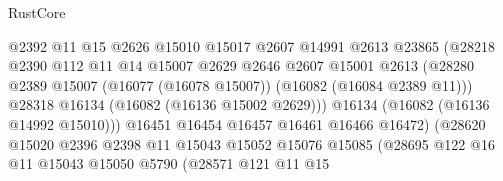 \begin{lexlean}{RustCore}
\begin{coremodule}
                                      @2392
                                      @11
                                      @15
                                      @2626
                                      @15010
                                      @15017
                                      @2607
                                      @14991
                                      @2613
                                      @23865
                                      (@28218
                                        @2390
                                        @112
                                        @11
                                        @14
                                        @15007
                                        @2629
                                        @2646
                                        @2607
                                        @15001
                                        @2613
                                        (@28280
                                          @2389
                                          @15007
                                          (@16077 (@16078 @15007))
                                          (@16082 (@16084 @2389 @11)))
                                        @28318
                                        @16134
                                        (@16082 (@16136 @15002 @2629)))
                                      @16134
                                      (@16082 (@16136 @14992 @15010)))
                                    @16451
                                    @16454
                                    @16457
                                    @16461
                                    @16466
                                    @16472)
                                  (@28620
                                    @15020
                                    @2396
                                    @2398
                                    @11
                                    @15043
                                    @15052
                                    @15076
                                    @15085
                                    (@28695
                                      @122
                                      @16
                                      @11
                                      @15043
                                      @15050
                                      @5790
                                      (@28571
                                        @121
                                        @11
                                        @15

\end{coremodule}
\end{lexlean}
